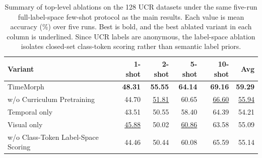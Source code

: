 \begin{table}[t]
\centering
\caption{Summary of top-level ablations on the 128 UCR datasets under the same five-run full-label-space few-shot protocol as the main results. Each value is mean accuracy (\%) over five runs. Best is bold, and the best ablated variant in each column is underlined. Since UCR labels are anonymous, the label-space ablation isolates closed-set class-token scoring rather than semantic label priors.}
\label{tab:ablation-summary}
\begin{tabular}{lrrrrr}
\toprule
Variant & 1-shot & 2-shot & 5-shot & 10-shot & Avg \\
\midrule
TimeMorph & \textbf{48.31} & \textbf{55.55} & \textbf{64.14} & \textbf{69.16} & \textbf{59.29} \\
\midrule
w/o Curriculum Pretraining & 44.70 & \underline{51.81} & 60.65 & \underline{66.60} & \underline{55.94} \\
Temporal only & 43.51 & 50.55 & 58.40 & 64.39 & 54.21 \\
Visual only & \underline{45.88} & 50.02 & \underline{60.86} & 63.58 & 55.09 \\
w/o Class-Token Label-Space Scoring & 44.46 & 50.44 & 60.08 & 65.59 & 55.14 \\
\bottomrule
\end{tabular}
\end{table}
